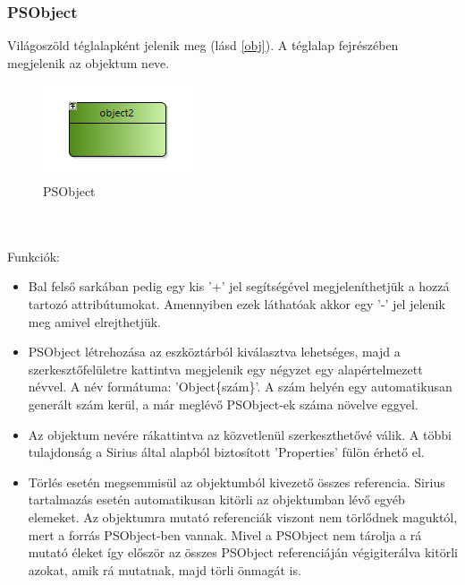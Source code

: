 \subsubsection{PSObject}
Világoszöld téglalapként jelenik meg (lásd \autoref{obj}).  A téglalap fejrészében megjelenik az objektum neve.
\begin{figure}[!ht]
	\centering
	\includegraphics{figures/obj.PNG}
	\caption{PSObject}
	\label{obj} 
\end{figure}
\\\\
Funkciók:
\begin{itemize}  	
	\item Bal felső sarkában pedig egy kis '+' jel segítségével megjeleníthetjük a hozzá tartozó attribútumokat. Amennyiben ezek láthatóak akkor egy '-' jel jelenik meg amivel elrejthetjük. 	
	
	\item PSObject létrehozása az eszköztárból kiválasztva lehetséges, majd a szerkesztőfelületre kattintva megjelenik egy négyzet egy alapértelmezett névvel. A név formátuma: 'Object\{szám\}'. A szám helyén egy automatikusan generált szám kerül, a már meglévő PSObject-ek száma növelve eggyel.

	\item Az objektum nevére rákattintva az közvetlenül szerkeszthetővé válik. A többi tulajdonság a Sirius által alapból biztosított 'Properties' fülön érhető el. 
	
	\item Törlés esetén megsemmisül az objektumból kivezető összes referencia. Sirius tartalmazás esetén automatikusan kitörli az objektumban lévő egyéb elemeket. Az objektumra mutató referenciák viszont nem törlődnek maguktól, mert a forrás PSObject-ben vannak. Mivel a PSObject nem tárolja a rá mutató éleket így először az összes PSObject referenciáján végigiterálva kitörli azokat, amik rá mutatnak, majd törli önmagát is. 
\end{itemize}


